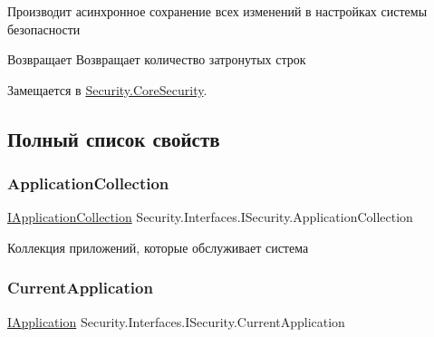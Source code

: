 Производит асинхронное сохранение всех изменений в настройках системы безопасности 

\begin{DoxyReturn}{Возвращает}
Возвращает количество затронутых строк
\end{DoxyReturn}


Замещается в \hyperlink{class_security_1_1_core_security_ac1c356b6ee81025a45d145512dfd41b7}{Security.\+Core\+Security}.



\subsection{Полный список свойств}
\mbox{\label{interface_security_1_1_interfaces_1_1_i_security_a290a992b30692e03bdb7e68d10105e52}} 
\subsubsection{\texorpdfstring{Application\+Collection}{ApplicationCollection}}
{\footnotesize\ttfamily \hyperlink{interface_security_1_1_interfaces_1_1_collections_1_1_i_application_collection}{I\+Application\+Collection} Security.\+Interfaces.\+I\+Security.\+Application\+Collection\hspace{0.3cm}{\ttfamily [get]}}



Коллекция приложений, которые обслуживает система 

\mbox{\label{interface_security_1_1_interfaces_1_1_i_security_a684f78876930b83d2324fa420bd6cba6}} 
\subsubsection{\texorpdfstring{Current\+Application}{CurrentApplication}}
{\footnotesize\ttfamily \hyperlink{interface_security_1_1_interfaces_1_1_model_1_1_i_application}{I\+Application} Security.\+Interfaces.\+I\+Security.\+Current\+Application\hspace{0.3cm}{\ttfamily [get]}}



